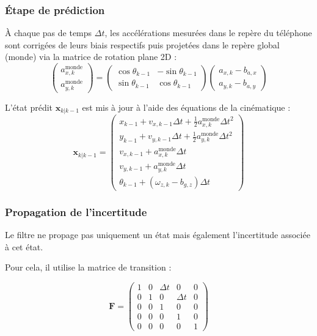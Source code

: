 \documentclass{article}
\begin{document}
\subsubsection{Étape de prédiction}
À chaque pas de temps $\Delta t$, les accélérations mesurées dans le repère du téléphone sont corrigées de leurs biais respectifs puis projetées dans le repère global (monde) via la matrice de rotation plane 2D :
\[
\begin{pmatrix} a_{x,k}^{\text{monde}} \\ a_{y,k}^{\text{monde}} \end{pmatrix} = 
\begin{pmatrix} \cos\theta_{k-1} & -\sin\theta_{k-1} \\ \sin\theta_{k-1} & \cos\theta_{k-1} \end{pmatrix}
\begin{pmatrix} a_{x,k} - b_{a,x} \\ a_{y,k} - b_{a,y} \end{pmatrix}
\]

L'état prédit $\mathbf{x}_{k|k-1}$ est mis à jour à l'aide des équations de la cinématique :
\[
\mathbf{x}_{k|k-1} = \begin{pmatrix}
x_{k-1} + v_{x,k-1}\Delta t + \frac{1}{2}a_{x,k}^{\text{monde}}\Delta t^2 \\
y_{k-1} + v_{y,k-1}\Delta t + \frac{1}{2}a_{y,k}^{\text{monde}}\Delta t^2 \\
v_{x,k-1} + a_{x,k}^{\text{monde}}\Delta t \\
v_{y,k-1} + a_{y,k}^{\text{monde}}\Delta t \\
\theta_{k-1} + (\omega_{z,k} - b_{g,z})\Delta t
\end{pmatrix}
\]

\subsubsection{Propagation de l'incertitude}

Le filtre ne propage pas uniquement un état mais également l'incertitude associée à cet état.

Pour cela, il utilise la matrice de transition :

\[
\mathbf{F} = \begin{pmatrix}
1 & 0 & \Delta t & 0 & 0 \\
0 & 1 & 0 & \Delta t & 0 \\
0 & 0 & 1 & 0 & 0 \\
0 & 0 & 0 & 1 & 0 \\
0 & 0 & 0 & 0 & 1
\end{pmatrix}
\]
\end{document}

